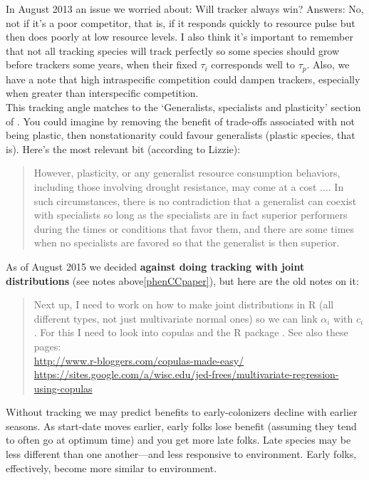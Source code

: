 \documentclass[11pt,a4paper,oneside]{article}
\begin{document}
\noindent In August 2013 an issue we worried about: Will tracker always win? Answers: No, not if it's a poor competitor, that is, if it responds quickly to resource pulse but then does poorly at low resource levels. I also think it's important to remember that not all tracking species will track perfectly so some species should grow before trackers some years, when their fixed \(\tau_{i}\) corresponds well to \(\tau_{p}\). Also, we have a note that high intraspecific competition could dampen trackers, especially when greater than interspecific competition.\\

\noindent This tracking angle matches to the `Generalists, specialists and plasticity' section of \citet{Chesson:2004eo}. You could imagine by removing the benefit of trade-offs associated with not being plastic, then nonstationarity could favour generalists (plastic species, that is). Here's the most relevant bit (according to Lizzie):
\begin{quote}
However, plasticity, or any generalist resource consumption
behaviors, including those involving drought resistance,
may come at a cost .... In such circumstances, there is no
contradiction that a generalist can coexist with specialists
so long as the specialists are in fact superior performers
during the times or conditions that favor them, and there 
are some times when no specialists are favored so that the
generalist is then superior.
\end{quote}

As of August 2015 we decided {\bf against doing tracking with joint distributions} (see notes above\ref{phenCCpaper}), but here are the old notes on it:
\begin{quote}
Next up, I need to work on how to make joint distributions in R (all different types, not just multivariate normal ones) so we can link \(\alpha_{i}\) with \(c_{i}\). For this I need to look into copulas and the R package \verb@copula@. See also these pages:\\
\url{http://www.r-bloggers.com/copulas-made-easy/}\\
\url{https://sites.google.com/a/wisc.edu/jed-frees/multivariate-regression-using-copulas}
\end{quote}

Without tracking we may predict benefits to early-colonizers decline with earlier seasons. As start-date moves earlier, early folks lose benefit (assuming they tend to often go at optimum time) and you get more late folks. Late species may be less different than one another---and less responsive to environment. Early folks, effectively, become more similar to environment. 
\end{document}
